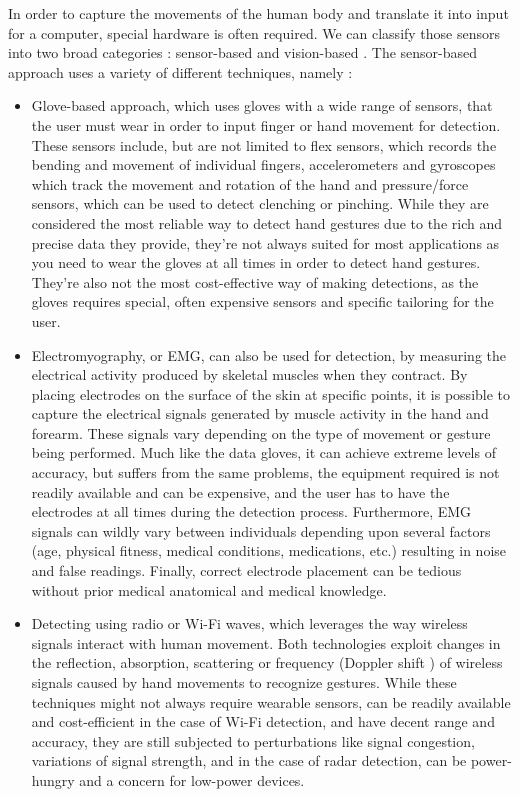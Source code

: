 \documentclass[12pt]{article}
\begin{document}
In order to capture the movements of the human body and translate it into input for a computer, special hardware is often required. We can classify those sensors into two broad categories : sensor-based and vision-based \cite{qi2024computer}.
The sensor-based approach uses a variety of different techniques, namely :
\begin{itemize}
  \item Glove-based approach, which uses gloves with a wide range of sensors, that the user must wear in order to input finger or hand movement for detection. These sensors include, but are not limited to flex sensors, which records the bending and movement of individual fingers, accelerometers and gyroscopes which track the movement and rotation of the hand and pressure/force sensors, which can be used to detect clenching or pinching. While they are considered the most reliable way to detect hand gestures due to the rich and precise data they provide, they're not always suited for most applications as you need to wear the gloves at all times in order to detect hand gestures. They're also not the most cost-effective way of making detections, as the gloves requires special, often expensive sensors and specific tailoring for the user.
  \item Electromyography, or EMG, can also be used for detection, by measuring the electrical activity produced by skeletal muscles when they contract. By placing electrodes on the surface of the skin at specific points, it is possible to capture the electrical signals generated by muscle activity in the hand and forearm. These signals vary depending on the type of movement or gesture being performed. Much like the data gloves, it can achieve extreme levels of accuracy, but suffers from the same problems, the equipment required is not readily available and can be expensive, and the user has to have the electrodes at all times during the detection process. Furthermore, EMG signals can wildly vary between individuals depending upon several factors (age, physical fitness, medical conditions, medications, etc.) resulting in noise and false readings. Finally, correct electrode placement can be tedious without prior medical anatomical and medical knowledge.
  \item Detecting using radio or Wi-Fi waves, which leverages the way wireless signals interact with human movement. Both technologies exploit changes in the reflection, absorption, scattering or frequency (Doppler shift \cite{kim2016hand}) of wireless signals caused by hand movements to recognize gestures. While these techniques might not always require wearable sensors, can be readily available and cost-efficient in the case of Wi-Fi detection, and have decent range and accuracy, they are still subjected to perturbations like signal congestion, variations of signal strength, and in the case of radar detection, can be power-hungry and a concern for low-power devices.
\end{itemize}
\end{document}
